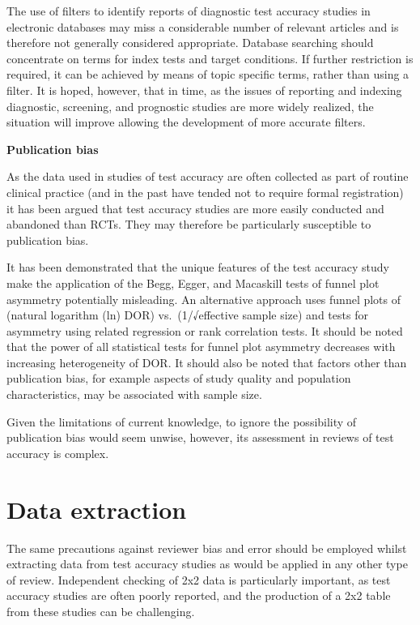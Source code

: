 \documentclass[
  10pt,
  a4paper,
  DIV=11,
  numbers=noendperiod]{scrreprt}
\begin{document}
The use of filters to identify reports of diagnostic test accuracy
studies in electronic databases may miss a considerable number of
relevant articles and is therefore not generally considered appropriate.
Database searching should concentrate on terms for index tests and
target conditions. If further restriction is required, it can be
achieved by means of topic specific terms, rather than using a filter.
It is hoped, however, that in time, as the issues of reporting and
indexing diagnostic, screening, and prognostic studies are more widely
realized, the situation will improve allowing the development of more
accurate filters.

\textbf{Publication bias}

As the data used in studies of test accuracy are often collected as part
of routine clinical practice (and in the past have tended not to require
formal registration) it has been argued that test accuracy studies are
more easily conducted and abandoned than RCTs. They may therefore be
particularly susceptible to publication bias.

It has been demonstrated that the unique features of the test accuracy
study make the application of the Begg, Egger, and Macaskill tests of
funnel plot asymmetry potentially misleading. An alternative approach
uses funnel plots of (natural logarithm (ln) DOR) vs.~(1/√effective
sample size) and tests for asymmetry using related regression or rank
correlation tests. It should be noted that the power of all statistical
tests for funnel plot asymmetry decreases with increasing heterogeneity
of DOR. It should also be noted that factors other than publication
bias, for example aspects of study quality and population
characteristics, may be associated with sample size.

Given the limitations of current knowledge, to ignore the possibility of
publication bias would seem unwise, however, its assessment in reviews
of test accuracy is complex.

\section{Data extraction}\label{data-extraction-1}

The same precautions against reviewer bias and error should be employed
whilst extracting data from test accuracy studies as would be applied in
any other type of review. Independent checking of 2x2 data is
particularly important, as test accuracy studies are often poorly
reported, and the production of a 2x2 table from these studies can be
challenging.
\end{document}
